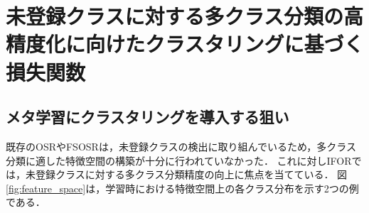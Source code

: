 \documentclass[a4paper,11pt,nomag]{jsreport}
\begin{document}
\section{未登録クラスに対する多クラス分類の高精度化に向けたクラスタリングに基づく損失関数}

\subsection{メタ学習にクラスタリングを導入する狙い}
\label{subsec:purpose}

既存のOSRやFSOSRは，未登録クラスの検出に取り組んでいるため，多クラス分類に適した特徴空間の構築が十分に行われていなかった．
これに対しIFORでは，未登録クラスに対する多クラス分類精度の向上に焦点を当てている．
図 \ref{fig:feature_space}は，学習時における特徴空間上の各クラス分布を示す2つの例である．
% 
\end{document}
